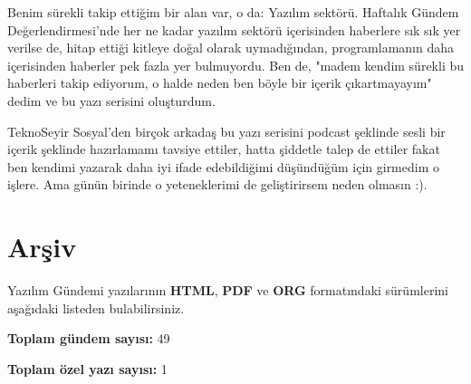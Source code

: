 \documentclass[11pt]{article}
\begin{document}
Benim sürekli takip ettiğim bir alan var, o da: Yazılım sektörü. Haftalık
Gündem Değerlendirmesi'nde her ne kadar yazılım sektörü içerisinden haberlere
sık sık yer verilse de, hitap ettiği kitleye doğal olarak uymadığından,
programlamanın daha içerisinden haberler pek fazla yer bulmuyordu. Ben de,
"madem kendim sürekli bu haberleri takip ediyorum, o halde neden ben böyle bir
içerik çıkartmayayım" dedim ve bu yazı serisini oluşturdum.

TeknoSeyir Sosyal'den birçok arkadaş bu yazı serisini podcast şeklinde sesli
bir içerik şeklinde hazırlamamı tavsiye ettiler, hatta şiddetle talep de
ettiler fakat ben kendimi yazarak daha iyi ifade edebildiğimi düşündüğüm için
girmedim o işlere. Ama günün birinde o yeteneklerimi de geliştirirsem neden
olmasın :).
\section*{Arşiv}
\label{sec:org9538b81}
Yazılım Gündemi yazılarının \textbf{HTML}, \textbf{PDF} ve \textbf{ORG} formatındaki sürümlerini
aşağıdaki listeden bulabilirsiniz.

\textbf{\textbf{Toplam gündem sayısı:}} 49

\textbf{\textbf{Toplam özel yazı sayısı:}} 1
\end{document}
